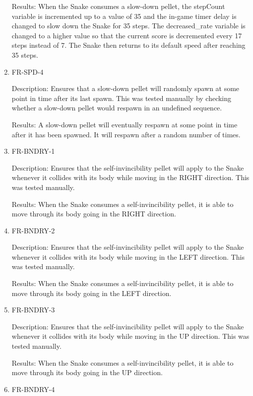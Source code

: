 \documentclass[12pt, titlepage]{article}
\begin{document}
\begin{enumerate}
Results: When the Snake consumes a slow-down pellet, the stepCount variable is incremented up to a value of 35 and the in-game timer delay is changed to slow down the Snake for 35 steps. The decreased\_rate variable is changed to a higher value so that the current score is decremented every 17 steps instead of 7. The Snake then returns to its default speed after reaching 35 steps.

\item{FR-SPD-4}
\label{fr:spd-4}

Description: Ensures that a slow-down pellet will randomly spawn at some point in time after its last spawn. This was tested manually by checking whether a 
slow-down pellet would respawn in an undefined sequence.

Results: A slow-down pellet will eventually respawn at some point in time after it has been spawned. It will respawn after a random number of times.

\item{FR-BNDRY-1}
\label{fr:bndry-1}

Description: Ensures that the self-invincibility pellet will apply to the Snake whenever it collides with its body while moving in the RIGHT direction. This was tested manually.

Results: When the Snake consumes a self-invincibility pellet, it is able to move through its body going in the RIGHT direction.

\item{FR-BNDRY-2}
\label{fr:bndry-2}

Description: Ensures that the self-invincibility pellet will apply to the Snake whenever it collides with its body while moving in the LEFT direction. This was tested manually.

Results: When the Snake consumes a self-invincibility pellet, it is able to move through its body going in the LEFT direction.

\item{FR-BNDRY-3}
\label{fr:bndry-3}

Description: Ensures that the self-invincibility pellet will apply to the Snake whenever it collides with its body while moving in the UP direction. This was tested manually.

Results: When the Snake consumes a self-invincibility pellet, it is able to move through its body going in the UP direction.

\item{FR-BNDRY-4}
\label{fr:bndry-4}


\end{enumerate}
\end{document}

